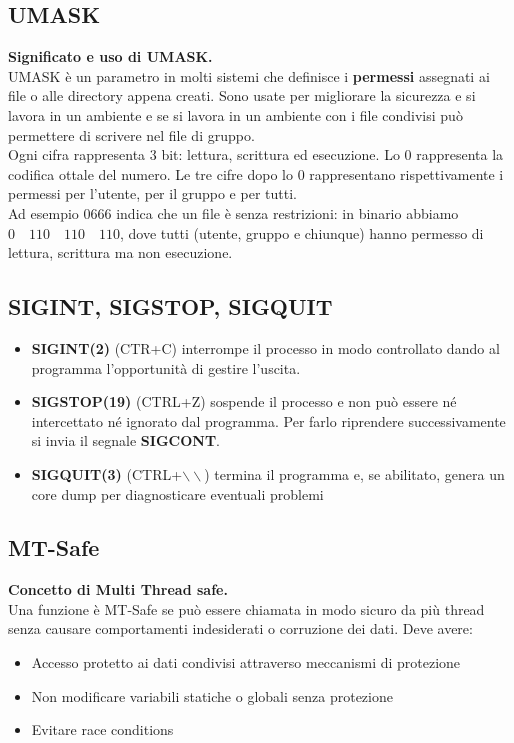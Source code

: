\subsection{UMASK}
\textbf{Significato e uso di UMASK.}\\
UMASK è un parametro in molti sistemi che definisce i \textbf{permessi} assegnati ai file o alle directory appena creati. Sono usate per migliorare la sicurezza e si lavora in un ambiente e se si lavora in un ambiente con i file condivisi può permettere di scrivere nel file di gruppo.\\
Ogni cifra rappresenta $3$ bit: lettura, scrittura ed esecuzione. Lo $0$ rappresenta la codifica ottale del numero. Le tre cifre dopo lo $0$ rappresentano rispettivamente i permessi per l'utente, per il gruppo e per tutti.\\
Ad esempio $0666$ indica che un file è senza restrizioni: in binario abbiamo $0 \quad 110 \quad 110 \quad 110$, dove tutti (utente, gruppo e chiunque) hanno permesso di lettura, scrittura ma non esecuzione.

\subsection{SIGINT, SIGSTOP, SIGQUIT}
\begin{itemize}
	\item \textbf{SIGINT(2)} (CTR+C) interrompe il processo in modo controllato dando al programma l'opportunità di gestire l'uscita.
	\item \textbf{SIGSTOP(19)} (CTRL+Z) sospende il processo e non può essere né intercettato né ignorato dal programma. Per farlo riprendere successivamente si invia il segnale \textbf{SIGCONT}.
	\item \textbf{SIGQUIT(3)} (CTRL+$\backslash\backslash$) termina il programma e, se abilitato, genera un core dump per diagnosticare eventuali problemi
\end{itemize}

\subsection{MT-Safe}
\textbf{Concetto di Multi Thread safe.}\\
Una funzione è MT-Safe se può essere chiamata in modo sicuro da più thread senza causare comportamenti indesiderati o corruzione dei dati. Deve avere:
\begin{itemize}
	\item Accesso protetto ai dati condivisi attraverso meccanismi di protezione
	\item Non modificare variabili statiche o globali senza protezione
	\item Evitare race conditions
\end{itemize}

